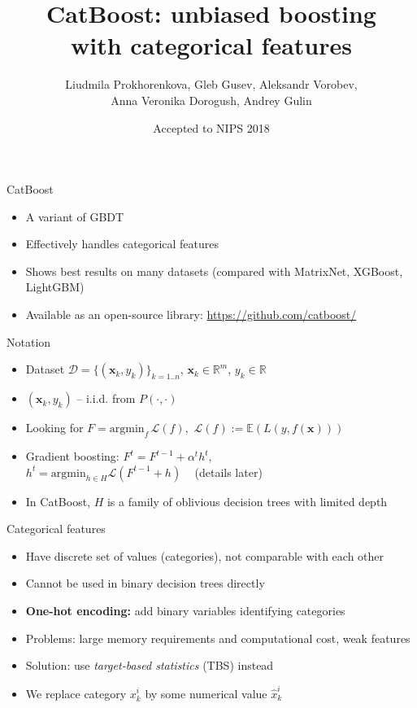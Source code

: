 \documentclass[pdf, 12pt, unicode]{beamer}
\title[CatBoost]{CatBoost: unbiased boosting \\ with categorical features}
\author[Liudmila Prokhorenkova et al.]{Liudmila Prokhorenkova, Gleb Gusev, Aleksandr  Vorobev, \\ Anna Veronika  Dorogush, Andrey  Gulin}
\date[]{Accepted to NIPS 2018}
\newcommand{\x}{\mathbf{x}}
\newcommand{\D}{\mathcal{D}}
\newcommand{\R}{\mathbb{R}}
\newcommand{\E}{\mathbb{E}}
\newcommand{\1}{\mathbbm{1}}
\begin{document}
\begin{frame}
\transdissolve[duration=0.2]
\titlepage
\end{frame}

\begin{frame}{CatBoost}
	
\begin{itemize}
\item A variant of GBDT
\item Effectively handles categorical features
\item Shows best results on many datasets (compared with MatrixNet, XGBoost, LightGBM)
\item Available as an open-source library: \url{https://github.com/catboost/}
\end{itemize}
\end{frame}

\begin{frame}{Notation}
\begin{itemize}
	\item Dataset $\D=\{(\x_k,y_k)\}_{k=1..n}$, $\x_k\in \R^m$, $y_k\in \R$ 
	\item $(\x_k,y_k)$ -- i.i.d. from $P(\cdot,\cdot)$
	\pause
	\item Looking for  $F = \mathrm{argmin}_f \, \mathcal{L}(f),\,  \,\mathcal{L}(f) := \E(L(y, f(\x)))$
	\pause
	\item Gradient boosting: $F^{t}=F^{t-1}+ \alpha^t h^{t}$,\\ 
	$h^t = \mathrm{argmin}_{h\in H} \mathcal{L}(F^{t-1}+h)$ \,\,\, (details later)
	\pause
	\item In CatBoost, $H$ is a family of oblivious decision trees with limited depth
\end{itemize}
	
\end{frame}

\begin{frame}{Categorical features}
\begin{itemize}
	\item Have discrete set of values (categories), not comparable with each other
	\item Cannot be used in binary decision trees directly
	\pause
	\item \textbf{One-hot encoding:} add binary variables identifying categories
	\item Problems: large memory requirements and computational cost, weak features
	\pause
	\item Solution: use \textit{target-based statistics} (TBS) instead
	\item We replace category $x_{k}^{i}$ by some numerical value $\hat x_{k}^{i}$
\end{itemize}
\end{frame}
\end{document}
